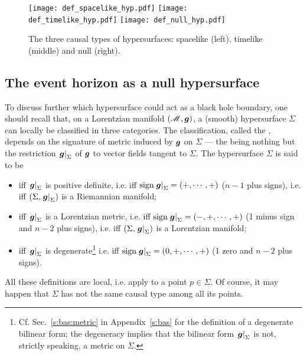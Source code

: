 \begin{figure}
\centerline{\texttt{[image: def\_spacelike\_hyp.pdf]}
\texttt{[image: def\_timelike\_hyp.pdf]}
\texttt{[image: def\_null\_hyp.pdf]}}
\caption[]{\label{f:def:hypersurfaces} \footnotesize
The three causal types of hypersurfaces:
spacelike (left), timelike (middle) and null (right).}
\end{figure}

\subsection{The event horizon as a null hypersurface} \label{s:def:hor_as_null}

To discuss further which hypersurface could act as a black hole boundary,
one should recall that, on a Lorentzian manifold $(\mathscr{M},\bm{g})$,
a (smooth) hypersurface $\Sigma$ can locally be classified in three categories.
The classification, called the ,
depends on the signature of metric induced by $\bm{g}$ on
$\Sigma$  --- the
 being
nothing but the restriction $\left.\bm{g}\right| _{\Sigma}$ of $\bm{g}$
to vector fields tangent to $\Sigma$.
The hypersurface $\Sigma$ is said to be
\begin{itemize}
\item {} iff $\left.\bm{g}\right| _{\Sigma}$ is positive definite,
i.e. iff $\mathrm{sign} \left.\bm{g}\right| _{\Sigma} = (+,\cdots,+)$ ($n-1$ plus signs),
i.e. iff $(\Sigma,  \left.\bm{g}\right| _{\Sigma})$ is a Riemannian manifold;
\item {} iff $\left.\bm{g}\right| _{\Sigma}$ is a Lorentzian metric,
i.e. iff $\mathrm{sign} \left.\bm{g}\right| _{\Sigma} = (-,+,\cdots,+)$ (1 minus sign and
$n-2$ plus signs),
i.e. iff $(\Sigma,  \left.\bm{g}\right| _{\Sigma})$ is a Lorentzian manifold;
\item {} iff $\left.\bm{g}\right| _{\Sigma}$ is degenerate\footnote{
Cf. Sec.~\ref{s:bas:metric} in Appendix~\ref{s:bas} for the definition of a
degenerate bilinear form; the degeneracy
implies that the bilinear form $\left.\bm{g}\right| _{\Sigma}$ is not,
strictly speaking, a metric on $\Sigma$.}
i.e. iff $\mathrm{sign} \left.\bm{g}\right| _{\Sigma} = (0,+,\cdots,+)$
(1 zero and $n-2$ plus signs).
\end{itemize}
All these definitions are local, i.e. apply to a point $p\in\Sigma$.
Of course, it may happen that $\Sigma$ has not the same causal type
among all its points.

